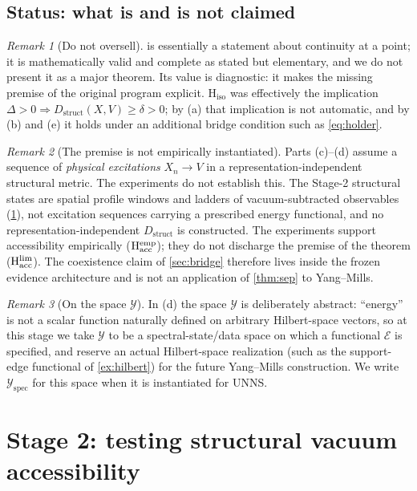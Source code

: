 \documentclass[11pt,a4paper]{article}
\theoremstyle{definition}
\theoremstyle{remark}
\newtheorem{remark}{Remark}
\newcommand{\Dstruct}{D_{\mathrm{struct}}}
\newcommand{\Yspec}{\mathcal{Y}_{\mathrm{spec}}}
\newcommand{\uns}{UNNS}
\newcommand{\Hacc}{\mathrm{H}_{\mathrm{acc}}}
\newcommand{\Hiso}{\mathrm{H}_{\mathrm{iso}}}
\begin{document}
\subsection{Status: what is and is not claimed}
\begin{remark}[Do not oversell]\label{rem:oversell}
 is essentially a statement about continuity at a point; it is mathematically valid and complete as stated but elementary, and we do not present it as a major theorem. Its value is diagnostic: it makes the missing premise of the original program explicit. $\Hiso$ was effectively the implication $\Delta>0\Rightarrow\Dstruct(X,V)\ge\delta>0$; by (a) that implication is not automatic, and by (b) and (e) it holds under an additional bridge condition such as \eqref{eq:holder}.
\end{remark}
\begin{remark}[The premise is not empirically instantiated]\label{rem:premise}
Parts (c)--(d) assume a sequence of \emph{physical excitations} $X_n\to V$ in a representation-independent structural metric. The experiments do not establish this. The Stage-2 structural states are spatial profile windows and ladders of vacuum-subtracted observables (\cref{sec:stage2}), not excitation sequences carrying a prescribed energy functional, and no representation-independent $\Dstruct$ is constructed. The experiments support accessibility empirically ($\Hacc^{\rm emp}$); they do not discharge the premise of the theorem ($\Hacc^{\rm lim}$). The coexistence claim of \cref{sec:bridge} therefore lives inside the frozen evidence architecture and is not an application of \cref{thm:sep} to Yang--Mills.
\end{remark}
\begin{remark}[On the space $\mathcal Y$]
In (d) the space $\mathcal Y$ is deliberately abstract: ``energy'' is not a scalar function naturally defined on arbitrary Hilbert-space vectors, so at this stage we take $\mathcal Y$ to be a spectral-state/data space on which a functional $\mathcal E$ is specified, and reserve an actual Hilbert-space realization (such as the support-edge functional of \cref{ex:hilbert}) for the future Yang--Mills construction. We write $\Yspec$ for this space when it is instantiated for \uns{}.
\end{remark}

\section{Stage 2: testing structural vacuum accessibility}\label{sec:stage2}
\end{document}
